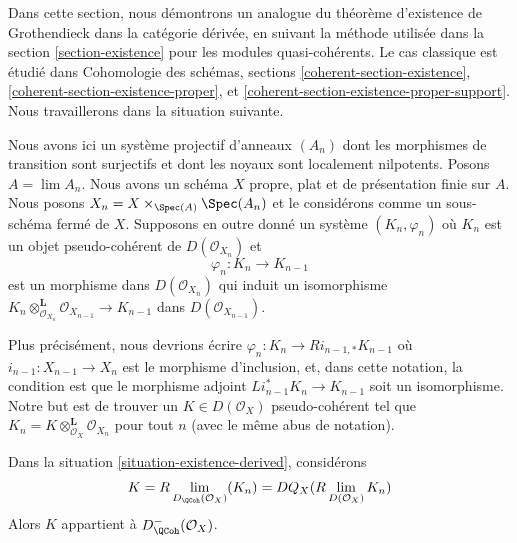 \noindent
Dans cette section, nous démontrons un analogue du théorème d'existence de Grothendieck
dans la catégorie dérivée, en suivant la méthode utilisée dans la
section \ref{section-existence} pour les modules quasi-cohérents.
Le cas classique est étudié dans
Cohomologie des schémas, sections \ref{coherent-section-existence},
\ref{coherent-section-existence-proper}, et
\ref{coherent-section-existence-proper-support}.
Nous travaillerons dans la situation suivante.

\begin{situation}
\label{situation-existence-derived}
Nous avons ici un système projectif d'anneaux $(A_n)$ dont les morphismes de transition
sont surjectifs et dont les noyaux sont localement nilpotents. Posons $A = \lim A_n$. Nous avons un
schéma $X$ propre, plat et de présentation finie sur $A$.
Nous posons $X_n = X \times_{\Spec(A)} \Spec(A_n)$ et le
considérons comme un sous-schéma fermé de $X$. Supposons en outre donné un système
$(K_n, \varphi_n)$ où $K_n$ est un objet pseudo-cohérent de
$D(\mathcal{O}_{X_n})$ et
$$
\varphi_n : K_n \longrightarrow K_{n - 1}
$$
est un morphisme dans $D(\mathcal{O}_{X_n})$ qui induit un isomorphisme
$K_n \otimes_{\mathcal{O}_{X_n}}^\mathbf{L} \mathcal{O}_{X_{n - 1}}
\to K_{n - 1}$ dans $D(\mathcal{O}_{X_{n - 1}})$.
\end{situation}

\noindent
Plus précisément, nous devrions écrire
$\varphi_n : K_n \to Ri_{n - 1, *}K_{n - 1}$
où $i_{n - 1} : X_{n - 1} \to X_n$ est le morphisme d'inclusion,
et, dans cette notation, la condition est que le morphisme
adjoint $Li_{n - 1}^*K_n \to K_{n - 1}$ soit un isomorphisme.
Notre but est de trouver un $K \in D(\mathcal{O}_X)$ pseudo-cohérent
tel que $K_n = K \otimes_{\mathcal{O}_X}^\mathbf{L} \mathcal{O}_{X_n}$
pour tout $n$ (avec le même abus de notation).

\begin{lemma}
\label{lemma-compute-what-it-should-be-derived}
Dans la situation \ref{situation-existence-derived}, considérons
$$
K = R\lim_{D_\QCoh(\mathcal{O}_X)}(K_n) =
DQ_X(R\lim_{D(\mathcal{O}_X)} K_n)
$$
Alors $K$ appartient à $D^-_{\QCoh}(\mathcal{O}_X)$.
\end{lemma}

